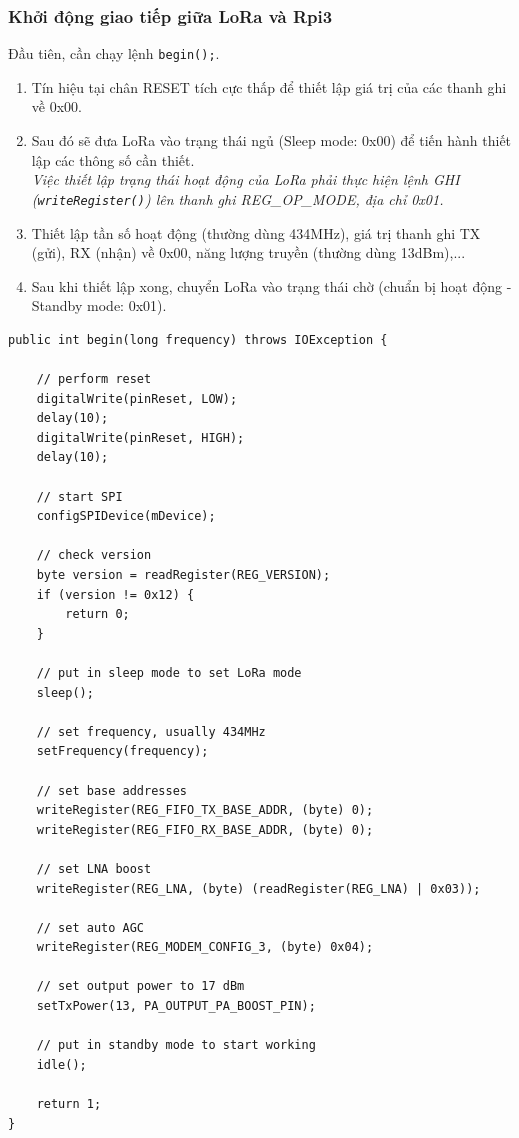 \subsubsection{Khởi động giao tiếp giữa LoRa và Rpi3}
Đầu tiên, cần chạy lệnh \lstinline{begin();}.
\begin{enumerate}
\item Tín hiệu tại chân RESET tích cực thấp để thiết lập giá trị của các thanh ghi về 0x00.
\item Sau đó sẽ đưa LoRa vào trạng thái ngủ (Sleep mode: 0x00) để tiến hành thiết lập các thông số cần thiết.\vspace*{0.5cm}\\
\textit{Việc thiết lập trạng thái hoạt động của LoRa phải thực hiện lệnh GHI (\lstinline{writeRegister()}) lên thanh ghi REG\_OP\_MODE, địa chỉ 0x01.}
\item Thiết lập tần số hoạt động (thường dùng 434MHz), giá trị thanh ghi TX (gửi), RX (nhận) về 0x00, năng lượng truyền (thường dùng 13dBm),...
\item Sau khi thiết lập xong, chuyển LoRa vào trạng thái chờ (chuẩn bị hoạt động - Standby mode: 0x01).
\end{enumerate}
\begin{lstlisting}[label={list:second},caption=Khởi động việc điều khiển board LoRa]
public int begin(long frequency) throws IOException {

    // perform reset
    digitalWrite(pinReset, LOW);
    delay(10);
    digitalWrite(pinReset, HIGH);
    delay(10);

    // start SPI
    configSPIDevice(mDevice);

    // check version
    byte version = readRegister(REG_VERSION);
    if (version != 0x12) {
        return 0;
    }

    // put in sleep mode to set LoRa mode
    sleep();

    // set frequency, usually 434MHz
    setFrequency(frequency);

    // set base addresses
    writeRegister(REG_FIFO_TX_BASE_ADDR, (byte) 0);
    writeRegister(REG_FIFO_RX_BASE_ADDR, (byte) 0);

    // set LNA boost
    writeRegister(REG_LNA, (byte) (readRegister(REG_LNA) | 0x03));

    // set auto AGC
    writeRegister(REG_MODEM_CONFIG_3, (byte) 0x04);

    // set output power to 17 dBm
    setTxPower(13, PA_OUTPUT_PA_BOOST_PIN);

    // put in standby mode to start working
    idle();

    return 1;
}
\end{lstlisting}


